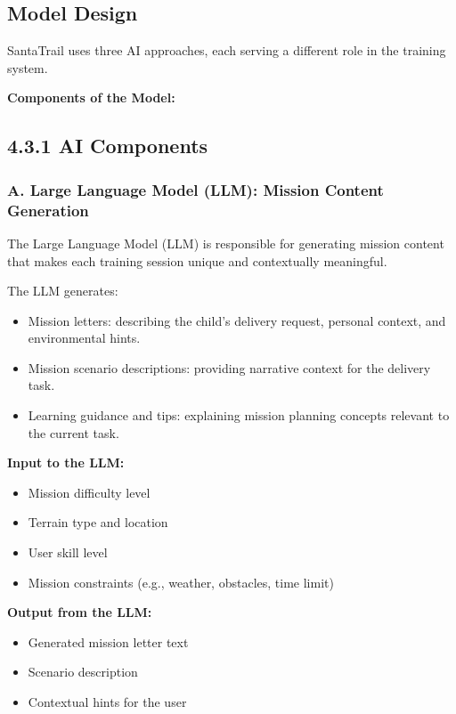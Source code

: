\subsection{Model Design}

SantaTrail uses three AI approaches, each serving a different role in the training system.

\textbf{Components of the Model:}

\subsection*{4.3.1 AI Components}

\subsubsection*{A. Large Language Model (LLM): Mission Content Generation}

The Large Language Model (LLM) is responsible for generating mission content that makes each training session unique and contextually meaningful.

The LLM generates:
\begin{itemize}
    \item Mission letters: describing the child's delivery request, personal context, and environmental hints.
    \item Mission scenario descriptions: providing narrative context for the delivery task.
    \item Learning guidance and tips: explaining mission planning concepts relevant to the current task.
\end{itemize}

\textbf{Input to the LLM:}
\begin{itemize}
    \item Mission difficulty level
    \item Terrain type and location
    \item User skill level
    \item Mission constraints (e.g., weather, obstacles, time limit)
\end{itemize}

\textbf{Output from the LLM:}
\begin{itemize}
    \item Generated mission letter text
    \item Scenario description
    \item Contextual hints for the user
\end{itemize}

